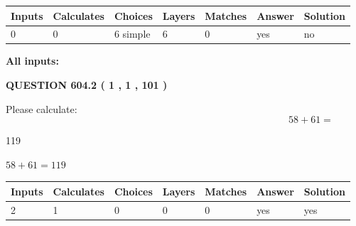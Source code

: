 \documentclass[12pt]{article}
\begin{document}
   
\noindent\begin{tabular}{|l|l|l|l|l|l|l|}
 \hline
Inputs & Calculates & Choices & Layers & Matches & Answer & Solution \\ \hline
 0  & 
 0  & 
 6
  simple  
  & 
 6  & 
 0  & 
  yes & 
  no 
  \\ \hline
 \end{tabular}
   
   
   
   
\noindent{}
   
   
   
   
\noindent\vspace{0.1in}\hspace{-0.08in} {\textbf{\Large{All inputs: }}}
   
   
  
\vspace{0.2in}
  
{\textbf{\Large{QUESTION
604.2 
 ( 1 , 1 , 101 )
}}}
  
  
 
Please calculate:
\begin{equation}
58 +  %
61 = \nonumber
\end{equation}
 
 
 
\noindent{}
 
 

119
 
 
\noindent{}
 
 

 
 
 
\noindent{}
 
 

$ %
58 +  %
61=   %
119$
 
 
\noindent{}
 
 

 
   
   
   
   
\noindent\begin{tabular}{|l|l|l|l|l|l|l|}
 \hline
Inputs & Calculates & Choices & Layers & Matches & Answer & Solution \\ \hline
 2  & 
 1  & 
 0
  & 
 0  & 
 0  & 
  yes & 
  yes 
  \\ \hline
 \end{tabular}
   
\end{document}
